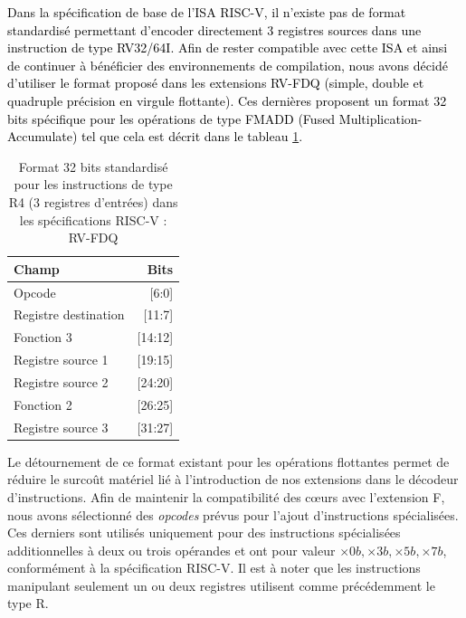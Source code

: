 \documentclass[../main.tex]{subfiles}
\begin{document}
\textcolor{black}{Dans la spécification de base de l'ISA RISC-V, il n'existe pas de format standardisé permettant d'encoder directement 3 registres sources dans une instruction de type RV32/64I.
Afin de rester compatible avec cette ISA et ainsi de continuer à bénéficier des environnements de compilation, nous avons décidé d'utiliser le format proposé dans les extensions RV-FDQ (simple, double et quadruple précision en virgule flottante).
Ces dernières proposent un format 32 bits spécifique pour les opérations de type FMADD (Fused Multiplication-Accumulate) tel que cela est décrit dans le tableau \ref{R4_instruction}.}



\begin{table}[]
    \centering
    \begin{tabular}{l|r}
        \toprule
         \textbf{Champ} & \textbf{Bits}  \\
         \bottomrule
         Opcode                 & [6:0]  \\
         Registre destination   & [11:7]  \\
         Fonction 3             & [14:12]  \\
         Registre source 1      & [19:15]  \\
         Registre source 2      & [24:20]  \\
         Fonction 2             & [26:25]  \\
         Registre source 3      & [31:27]  \\
        \bottomrule
    \end{tabular}
    \caption{Format 32 bits standardisé pour les instructions de type R4 (3 registres d'entrées) dans les spécifications RISC-V : RV-FDQ}
    \label{R4_instruction}
\end{table}
Le détournement de ce format existant pour les opérations flottantes permet de réduire le surcoût matériel lié à l'introduction de nos extensions dans le décodeur d'instructions.
Afin de maintenir la compatibilité des cœurs avec l'extension F, nous avons sélectionné des \textit{opcodes} prévus pour l'ajout d'instructions spécialisées.
Ces derniers sont utilisés uniquement pour des instructions spécialisées additionnelles à deux ou trois opérandes et ont pour valeur $\times0b, \times3b, \times5b, \times7b$, conformément à la spécification RISC-V.
Il est à noter que les instructions manipulant seulement un ou deux registres utilisent comme précédemment le type R.
\end{document}
